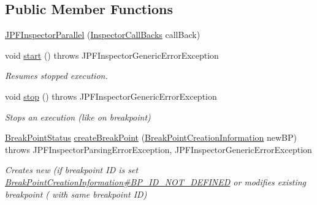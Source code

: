 \subsection*{Public Member Functions}
\begin{DoxyCompactItemize}
\item 
\hyperlink{classgov_1_1nasa_1_1jpf_1_1inspector_1_1server_1_1jpf_1_1_j_p_f_inspector_parallel_a1c5c528e7ec8e35d7929d1dbc1d9a1bd}{J\+P\+F\+Inspector\+Parallel} (\hyperlink{interfacegov_1_1nasa_1_1jpf_1_1inspector_1_1interfaces_1_1_inspector_call_backs}{Inspector\+Call\+Backs} call\+Back)
\item 
void \hyperlink{classgov_1_1nasa_1_1jpf_1_1inspector_1_1server_1_1jpf_1_1_j_p_f_inspector_parallel_a4535f0ac36121bb9469bc9cb033df3a7}{start} ()  throws J\+P\+F\+Inspector\+Generic\+Error\+Exception 
\begin{DoxyCompactList}\small\item\em Resumes stopped execution. \end{DoxyCompactList}\item 
void \hyperlink{classgov_1_1nasa_1_1jpf_1_1inspector_1_1server_1_1jpf_1_1_j_p_f_inspector_parallel_a463604600d1f706e87ace1aeb2c4ef39}{stop} ()  throws J\+P\+F\+Inspector\+Generic\+Error\+Exception 
\begin{DoxyCompactList}\small\item\em Stops an execution (like on breakpoint) \end{DoxyCompactList}\item 
\hyperlink{interfacegov_1_1nasa_1_1jpf_1_1inspector_1_1interfaces_1_1_break_point_status}{Break\+Point\+Status} \hyperlink{classgov_1_1nasa_1_1jpf_1_1inspector_1_1server_1_1jpf_1_1_j_p_f_inspector_parallel_a8cc6aa66d57647833e0314dff6a9b841}{create\+Break\+Point} (\hyperlink{interfacegov_1_1nasa_1_1jpf_1_1inspector_1_1interfaces_1_1_break_point_creation_information}{Break\+Point\+Creation\+Information} new\+BP)  throws J\+P\+F\+Inspector\+Parsing\+Error\+Exception, J\+P\+F\+Inspector\+Generic\+Error\+Exception 
\begin{DoxyCompactList}\small\item\em Creates new (if breakpoint ID is set \hyperlink{interfacegov_1_1nasa_1_1jpf_1_1inspector_1_1interfaces_1_1_break_point_creation_information_a24626231e3744e59f505d0731d4ca9e1}{Break\+Point\+Creation\+Information\#\+B\+P\+\_\+\+I\+D\+\_\+\+N\+O\+T\+\_\+\+D\+E\+F\+I\+N\+ED} or modifies existing breakpoint ( with same breakpoint ID) \end{DoxyCompactList}\item 

\end{DoxyCompactItemize}
